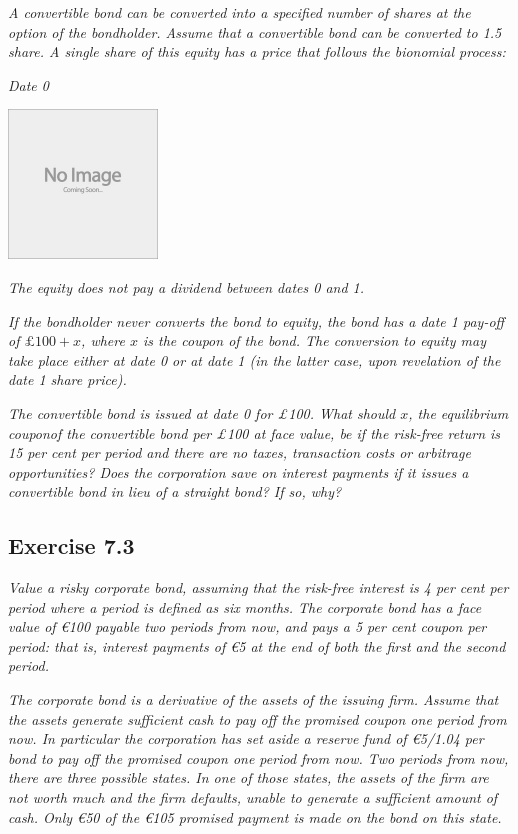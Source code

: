 \documentclass[]{book}
\newcommand{\euro}{€}
\theoremstyle{definition}
\theoremstyle{definition}
\theoremstyle{remark}
\begin{document}
\emph{A convertible bond can be converted into a specified number of
shares at the option of the bondholder. Assume that a convertible bond
can be converted to 1.5 share. A single share of this equity has a price
that follows the bionomial process:} \citep[p.234]{book}

\emph{Date 0} \citep[p.233]{book}

\begin{center}\includegraphics[width=150px]{figures/placeholder} \end{center}

\emph{The equity does not pay a dividend between dates 0 and 1.}
\citep[p.234]{book}

\emph{If the bondholder never converts the bond to equity, the bond has
a date 1 pay-off of \(£100 + x\), where \(x\) is the coupon of the bond.
The conversion to equity may take place either at date 0 or at date 1
(in the latter case, upon revelation of the date 1 share price).}
\citep[p.234]{book}

\emph{The convertible bond is issued at date 0 for £100. What should
\(x\), the equilibrium couponof the convertible bond per £100 at face
value, be if the risk-free return is 15 per cent per period and there
are no taxes, transaction costs or arbitrage opportunities? Does the
corporation save on interest payments if it issues a convertible bond in
lieu of a straight bond? If so, why?} \citep[p.234]{book}

\subsection{Exercise 7.3}\label{exercise-7.3}

\emph{Value a risky corporate bond, assuming that the risk-free interest
is 4 per cent per period where a period is defined as six months. The
corporate bond has a face value of \euro{}100 payable two periods from
now, and pays a 5 per cent coupon per period: that is, interest payments
of \euro{}5 at the end of both the first and the second period.}
\citep[p.234]{book}

\emph{The corporate bond is a derivative of the assets of the issuing
firm. Assume that the assets generate sufficient cash to pay off the
promised coupon one period from now. In particular the corporation has
set aside a reserve fund of \euro{}5/1.04 per bond to pay off the
promised coupon one period from now. Two periods from now, there are
three possible states. In one of those states, the assets of the firm
are not worth much and the firm defaults, unable to generate a
sufficient amount of cash. Only \euro{}50 of the \euro{}105 promised
payment is made on the bond on this state.} \citep[p.234]{book}
\end{document}
